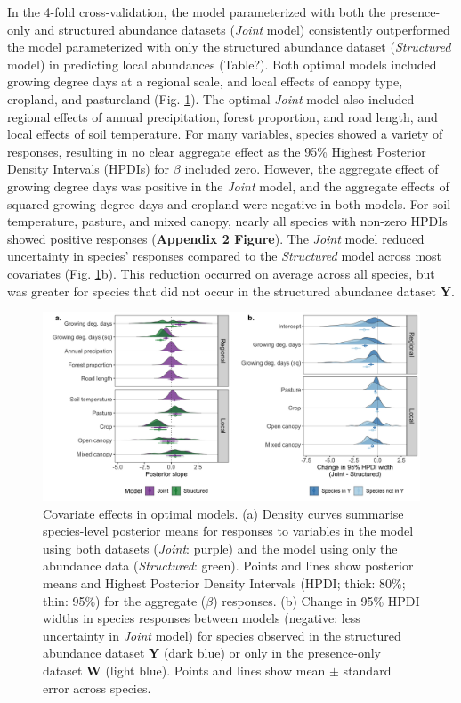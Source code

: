 \documentclass[preprint,review,times,12pt]{elsarticle}
\begin{document}
In the 4-fold cross-validation, the model parameterized with both the presence-only and structured abundance datasets (\emph{Joint} model) consistently outperformed the model parameterized with only the structured abundance dataset (\emph{Structured} model) in predicting local abundances (Table?). Both optimal models included growing degree days at a regional scale, and local effects of canopy type, cropland, and pastureland (Fig. \ref{fig:slope_means}). The optimal \emph{Joint} model also included regional effects of annual precipitation, forest proportion, and road length, and local effects of soil temperature. For many variables, species showed a variety of responses, resulting in no clear aggregate effect as the 95\% Highest Posterior Density Intervals (HPDIs) for $\beta$ included zero. However, the aggregate effect of growing degree days was positive in the \emph{Joint} model, and the aggregate effects of squared growing degree days and cropland were negative in both models. For soil temperature, pasture, and mixed canopy, nearly all species with non-zero HPDIs showed positive responses (\textbf{Appendix 2 Figure}). The \emph{Joint} model reduced uncertainty in species' responses compared to the \emph{Structured} model across most covariates (Fig. \ref{fig:slope_means}b). This reduction occurred on average across all species, but was greater for species that did not occur in the structured abundance dataset \textbf{Y}.

\begin{figure}
\centering\includegraphics[width=6in]{ms/1_Ecography/1/figs/slope_means+HDI.png}
\caption{\label{fig:slope_means} Covariate effects in optimal models. (a) Density curves summarise species-level posterior means for responses to variables in the model using both datasets (\emph{Joint}: purple) and the model using only the abundance data (\emph{Structured}: green). Points and lines show posterior means and Highest Posterior Density Intervals (HPDI; thick: 80\%; thin: 95\%) for the aggregate ($\beta$) responses. (b) Change in 95\% HPDI widths in species responses between models (negative: less uncertainty in \emph{Joint} model) for species observed in the structured abundance dataset \textbf{Y} (dark blue) or only in the presence-only dataset \textbf{W} (light blue). Points and lines show mean $\pm$ standard error across species. }
\end{figure}
\end{document}
